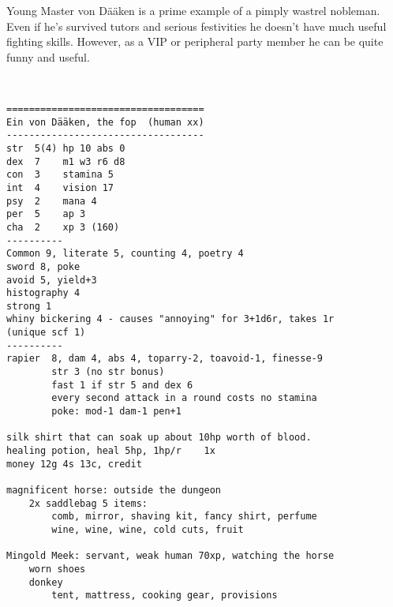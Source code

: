 \clearpage
\begin{samepage}

\noindent Young Master von Dääken is a prime example of a pimply wastrel nobleman. Even if he's survived tutors and serious festivities he doesn't have much useful fighting skills. However, as a VIP or peripheral party member he can be quite funny and useful.

\

\small \begin{verbatim}
===================================
Ein von Dääken, the fop  (human xx)
-----------------------------------
str  5(4) hp 10 abs 0
dex  7    m1 w3 r6 d8
con  3    stamina 5
int  4    vision 17
psy  2    mana 4
per  5    ap 3
cha  2    xp 3 (160)
----------
Common 9, literate 5, counting 4, poetry 4
sword 8, poke
avoid 5, yield+3
histography 4
strong 1
whiny bickering 4 - causes "annoying" for 3+1d6r, takes 1r        (unique scf 1)
----------
rapier  8, dam 4, abs 4, toparry-2, toavoid-1, finesse-9
        str 3 (no str bonus)
        fast 1 if str 5 and dex 6
        every second attack in a round costs no stamina
        poke: mod-1 dam-1 pen+1

silk shirt that can soak up about 10hp worth of blood.
healing potion, heal 5hp, 1hp/r    1x
money 12g 4s 13c, credit

magnificent horse: outside the dungeon
    2x saddlebag 5 items:
        comb, mirror, shaving kit, fancy shirt, perfume
        wine, wine, wine, cold cuts, fruit

Mingold Meek: servant, weak human 70xp, watching the horse
    worn shoes
    donkey
        tent, mattress, cooking gear, provisions
\end{verbatim} \end{samepage} \normalsize






